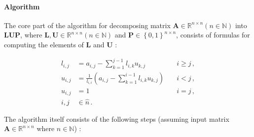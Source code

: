\paragraph{Algorithm} The core part of the algorithm for decomposing matrix $\mathbf{A} \in \mathbb{R}^{n \times n} \left(n \in \mathbb{N}\right)$ into $\mathbf{LUP}$, where $\mathbf{L}, \mathbf{U} \in \mathbb{R}^{n \times n} \left(n \in \mathbb{N}\right)$ and $\mathbf{P} \in \left\{0,1\right\}^{n \times n}$, consists of formulas for computing the elements of $\mathbf{L}$ and $\mathbf{U}$ \cite{Press2007}:

\begin{align}
	l_{i,j} & = a_{i,j} - \sum_{k=1}^{j-1}l_{i,k}u_{k,j} 								    & \quad i \geq j\,, \label{Equation:theory->ICMPP->LUP->CMPP->lij} \\
	u_{i,j} & = \frac{1}{l_{i,i}} \left ( a_{i,j} - \sum_{k=1}^{i-1}l_{i,k}u_{k,j} \right ) & \quad i < j\,, 	\label{Equation:theory->ICMPP->LUP->CMPP->uij} \\
	u_{i,j} & = 1 																	  	    & \quad i = j \nonumber\,, 	\\
	i,j 	& \in \widehat{n} \nonumber\,.
\end{align}

The algorithm itself consists of the following steps (assuming input matrix $\mathbf{A} \in \mathbb{R}^{n \times n}$ where $n \in \mathbb{N}$) \cite{Press2007, Forsythe1960}:

